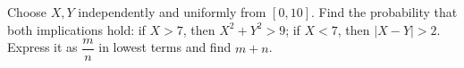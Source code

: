 Choose $X,Y$ independently and uniformly from $[0,10]$. Find the probability that both implications hold: if $X>7$, then $X^2+Y^2>9$; if $X<7$, then $|X-Y|>2$. Express it as $\dfrac{m}{n}$ in lowest terms and find $m+n$.
